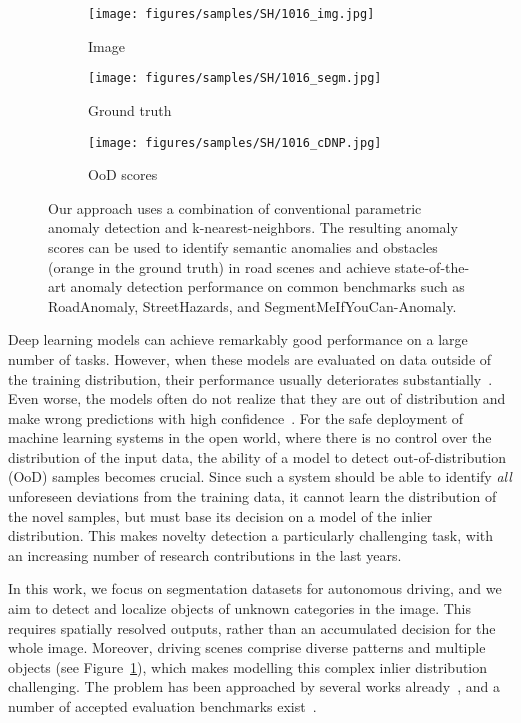 \documentclass[10pt,twocolumn,letterpaper]{article}
\begin{document}
\begin{figure}[h!]
    \begin{subfigure}[b]{0.15\textwidth}
        \centering
        \texttt{[image: figures/samples/SH/1016\_img.jpg]}
        \caption*{Image}
    \end{subfigure}
    \begin{subfigure}[b]{0.15\textwidth}
        \centering
        \texttt{[image: figures/samples/SH/1016\_segm.jpg]}
        \caption*{Ground truth}
    \end{subfigure}
    \begin{subfigure}[b]{0.15\textwidth}
        \centering
        \texttt{[image: figures/samples/SH/1016\_cDNP.jpg]}
        \caption*{OoD scores}
    \end{subfigure}
    \caption{Our approach uses a combination of conventional parametric anomaly detection and k-nearest-neighbors. The resulting anomaly scores can be used to identify semantic anomalies and obstacles (orange in the ground truth) in road scenes and achieve state-of-the-art anomaly detection performance on common benchmarks such as RoadAnomaly, StreetHazards, and SegmentMeIfYouCan-Anomaly.}
    \label{fig:teaser}
\end{figure} 
Deep learning models can achieve remarkably good performance on a large number of tasks. However, when these models are evaluated on data outside of the training distribution, their performance usually deteriorates substantially~\cite{hendrycks2018benchmarking}. Even worse, the models often do not realize that they are out of distribution and make wrong predictions with high confidence~\cite{guo2017calibration}. For the safe deployment of machine learning systems in the open world, where there is no control over the distribution of the input data, the ability of a model to detect out-of-distribution (OoD) samples becomes crucial.
Since such a system should be able to identify \emph{all} unforeseen deviations from the training data, it cannot learn the distribution of the novel samples, but must base its decision on a model of the inlier distribution. This makes novelty detection a particularly challenging task, with an increasing number of research contributions in the last years.

In this work, we focus on segmentation datasets for autonomous driving, and we aim to detect and localize objects of unknown categories in the image. This requires spatially resolved outputs, rather than an accumulated decision for the whole image. Moreover, driving scenes comprise diverse patterns and multiple objects (see Figure~\ref{fig:teaser}), which makes modelling this complex inlier distribution challenging. The problem has been approached by several works already~\cite{Jung_2021_ICCV, Tian2021, Xia2020, Grcic2022}, and a number of accepted evaluation benchmarks exist~\cite{a_benchmark, blum2019fishyscapes, segmentmeifyoucan2021}.
\end{document}
